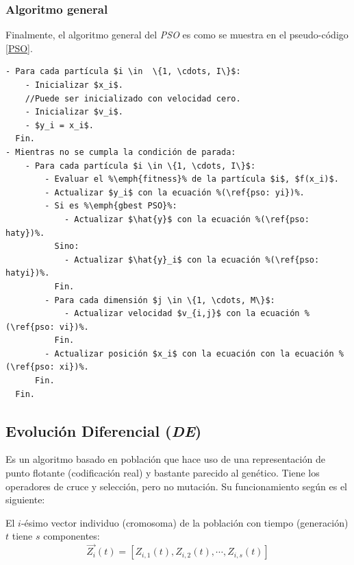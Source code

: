 \subsubsection{Algoritmo general}

    Finalmente, el algoritmo general del \emph{PSO} es como se muestra en el
pseudo-código \ref{PSO}.
\begin{lstlisting}[float=h, caption=Algoritmo General PSO\cite{PSO_0}, label=PSO]
- Para cada partícula $i \in  \{1, \cdots, I\}$:
    - Inicializar $x_i$.
    //Puede ser inicializado con velocidad cero.
    - Inicializar $v_i$.
    - $y_i = x_i$.
  Fin.
- Mientras no se cumpla la condición de parada:
    - Para cada partícula $i \in \{1, \cdots, I\}$:
        - Evaluar el %\emph{fitness}% de la partícula $i$, $f(x_i)$.
        - Actualizar $y_i$ con la ecuación %(\ref{pso: yi})%.
        - Si es %\emph{gbest PSO}%:
            - Actualizar $\hat{y}$ con la ecuación %(\ref{pso: haty})%.
          Sino:
            - Actualizar $\hat{y}_i$ con la ecuación %(\ref{pso: hatyi})%.
          Fin.
        - Para cada dimensión $j \in \{1, \cdots, M\}$:
            - Actualizar velocidad $v_{i,j}$ con la ecuación %(\ref{pso: vi})%.
          Fin.
        - Actualizar posición $x_i$ con la ecuación con la ecuación %(\ref{pso: xi})%.
      Fin.
  Fin.
\end{lstlisting}

\subsection{Evolución Diferencial (\emph{DE})} \label{sect:metade}

    Es un algoritmo basado en población que hace uso de
una representación de punto flotante (codificación real) y bastante parecido al
genético. Tiene los operadores de cruce y selección, pero no mutación. Su
funcionamiento según \cite{SwAjAm2008} es el siguiente:

    El $i$-ésimo vector individuo (cromosoma) de la población con tiempo
(generación) $t$ tiene $s$ componentes:
\begin{equation} \label{de: vector}
    \overrightarrow{Z_i}(t) = [ Z_{i,1}(t), Z_{i,2}(t), \cdots, Z_{i,s}(t) ]
\end{equation}


